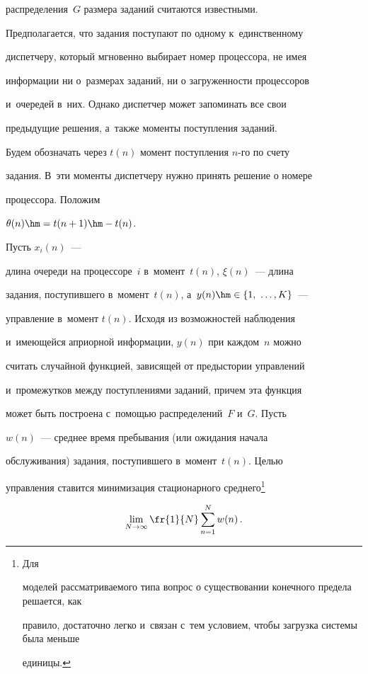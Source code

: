 распределения~$G$ размера заданий считаются известными. 


Предполагается, что задания поступают по одному к~единственному 


диспетчеру, который мгновенно выбирает номер процессора, не имея 


информации ни о~размерах заданий, ни о загруженности процессоров 


и~очередей в~них. Однако диспетчер может запоминать все свои 


предыдущие решения, а~также моменты поступления заданий. 


  


  Будем обозначать через $t(n)$ момент поступления $n$-го по счету 


задания. В~эти моменты диспетчеру нужно принять решение о номере 


процессора. Положим


 $\theta(n)\hm= t(n+1)\hm- t(n)$.


Пусть $x_i(n)$~--- 


длина очереди на процессоре~$i$ в~момент~$t(n)$, $\xi(n)$~--- длина 


задания, поступившего в~момент~$t(n)$, а~$y(n)\hm\in \{1,\ \ldots , K\}$~---  


управ\-ле\-ние в~момент $t(n)$. Исходя из возможностей наблюдения 


и~име\-ющей\-ся априорной информации, $y(n)$ при каждом~$n$ можно 


считать случайной функцией, зависящей от предыстории управ\-ле\-ний 


и~промежутков между поступлениями заданий, причем эта функция 


может быть построена с~по\-мощью распределений~$F$ и~$G$. Пусть 


$w(n)$~--- среднее время пребывания (или ожидания начала 


обслуживания) задания, поступившего в~момент~$t(n)$. Целью  


управ\-ле\-ния ставится минимизация стационарного среднего\footnote{Для 


моделей рассматриваемого типа вопрос о существовании конечного предела решается, как 


правило, достаточно легко и~связан с~тем условием, чтобы загрузка системы была меньше 


единицы.} 


$$\lim_{N\to\infty} \fr{1}{N} \sum_{n=1}^N w(n)\,.$$ 


